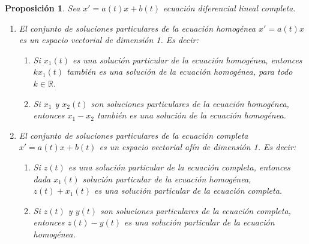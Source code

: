\documentclass[11pt, a4paper,twoside]{article}
\theoremstyle{theorem-style}  %
\newtheorem{proposition}[theorem]{Proposición}
\theoremstyle{definition-style}
\theoremstyle{example-style}
\begin{document}
\begin{proposition}
	Sea $ x'=a(t)x +b(t) $ ecuación diferencial lineal completa.
	\begin{enumerate}
		\item El conjunto de soluciones particulares de la ecuación homogénea $ x'=a(t)x $ es un espacio vectorial de dimensión 1. Es decir:
		\begin{enumerate}[\quad a)]
			\item Si $ x_1(t) $ es una solución particular de la ecuación homogénea, entonces $ kx_1(t) $ también es una solución de la ecuación homogénea, para todo $ k\in \mathbb{R} $.
			\item Si $ x_1 $ y $ x_2(t) $ son soluciones particulares de la ecuación homogénea, entonces $ x_1-x_2 $ también es una solución de la ecuación homogénea.
		\end{enumerate}
	\item El conjunto de soluciones particulares de la ecuación completa $  x'=a(t)x +b(t) $ es un espacio vectorial afín de dimensión 1. Es decir:
	\begin{enumerate}[\quad a)]
		\item Si $ z(t) $ es una solución particular de la ecuación completa, entonces dada $ x_1(t) $ solución particular de la ecuación homogénea, $ z(t)+x_1(t) $ es una solución particular de la ecuación completa.
		\item Si $ z(t) $ y $ y(t) $ son soluciones particulares de la ecuación completa, entonces $ z(t)-y(t) $ es una solución particular de la ecuación homogénea.
	\end{enumerate}
	\end{enumerate}
\end{proposition}
\end{document}
